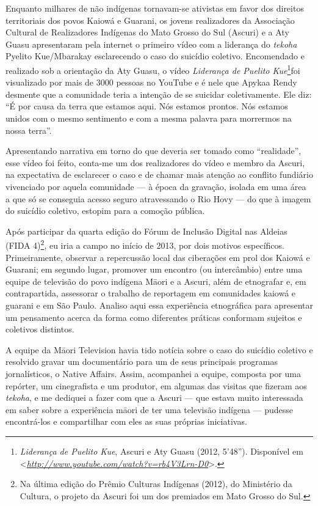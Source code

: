 Enquanto milhares de não indígenas tornavam-se ativistas em favor dos
direitos territoriais dos povos Kaiowá e Guarani, os jovens realizadores
da Associação Cultural de Realizadores Indígenas do Mato Grosso do Sul
(Ascuri) e a Aty Guasu apresentaram pela internet o primeiro vídeo com a
liderança do \emph{tekoha} Pyelito Kue/Mbarakay esclarecendo o caso do
suicídio coletivo. Encomendado e realizado sob a orientação da Aty
Guasu, o vídeo \emph{Liderança de Puelito Kue}\footnote{\emph{Liderança
  de Puelito Kue}, Ascuri e Aty Guasu (2012, 5'48''). Disponível em
  \textless{}\href{http://www.youtube.com/watch?v=rb4V3Lrn-D0}{\emph{http://www.youtube.com/watch?v=rb4V3Lrn-D0}}\textgreater{}.}foi
visualizado por mais de 3000 pessoas no YouTube e é nele que Apykaa
Rendy desmente que a comunidade teria a intenção de se suicidar
coletivamente. Ele diz: ``É por causa da terra que estamos aqui. Nós
estamos prontos. Nós estamos unidos com o mesmo sentimento e com a mesma
palavra para morrermos na nossa terra''.

Apresentando narrativa em torno do que deveria ser tomado como
``realidade'', esse vídeo foi feito, conta-me um dos realizadores do
vídeo e membro da Ascuri, na expectativa de esclarecer o caso e de
chamar mais atenção ao conflito fundiário vivenciado por aquela
comunidade --- à época da gravação, isolada em uma área a que só se
conseguia acesso seguro atravessando o Rio Hovy --- do que à imagem do
suicídio coletivo, estopim para a comoção pública.

Após participar da quarta edição do Fórum de Inclusão Digital nas
Aldeias (FIDA 4)\footnote{Na última edição do Prêmio Culturas Indígenas
  (2012), do Ministério da Cultura, o projeto da Ascuri foi um dos
  premiados em Mato Grosso do Sul.}, eu iria a campo no início de 2013,
por dois motivos específicos. Primeiramente, observar a repercussão
local das ciberações em prol dos Kaiowá e Guarani; em segundo lugar,
promover um encontro (ou intercâmbio) entre uma equipe de televisão do
povo indígena Māori e a Ascuri, além de etnografar e, em contrapartida,
assessorar o trabalho de reportagem em comunidades kaiowá e guarani e em
São Paulo. Analiso aqui essa experiência etnográfica para apresentar um
pensamento acerca da forma como diferentes práticas conformam sujeitos e
coletivos distintos.

A equipe da Māori Television havia tido notícia sobre o caso do suicídio
coletivo e resolvido gravar um documentário para um de seus principais
programas jornalísticos, o Native Affairs. Assim, acompanhei a equipe,
composta por uma repórter, um cinegrafista e um produtor, em algumas das
visitas que fizeram aos \emph{tekoha}, e me dediquei a fazer com que a
Ascuri --- que estava muito interessada em saber sobre a experiência
māori de ter uma televisão indígena --- pudesse encontrá-los e
compartilhar com eles as suas próprias iniciativas.

